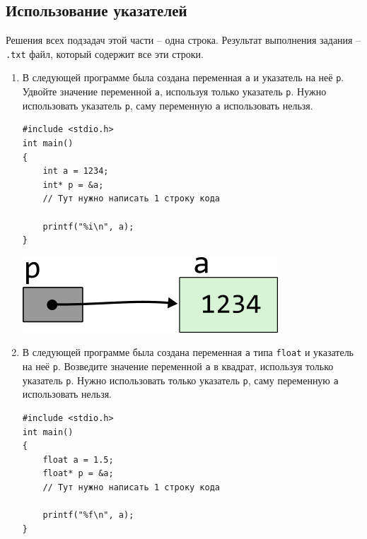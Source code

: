 \documentclass{article}
\begin{document}
\subsection{Использование указателей}
Решения всех подзадач этой части -- одна строка. Результат выполнения задания -- \texttt{.txt} файл, который содержит все эти строки.
\begin{enumerate}
\item В следующей программе была создана переменная \texttt{a} и указатель на неё \texttt{p}. Удвойте значение переменной \texttt{a}, используя только указатель \texttt{p}. Нужно использовать указатель \texttt{p}, саму переменную \texttt{a} использовать нельзя.
\begin{multicols}{2}
\begin{lstlisting}
#include <stdio.h>
int main() 
{
    int a = 1234;
    int* p = &a;
    // Тут нужно написать 1 строку кода
    
    printf("%i\n", a);
}
\end{lstlisting}

\vfill \null    
\columnbreak
\vfill \null 

\begin{center}
\vspace{1cm} 
\includegraphics[scale=1]{../images/pointer_schemes/pointer_to_int.png}
\end{center}
\end{multicols}

\item В следующей программе была создана переменная \texttt{a} типа \texttt{float} и указатель на неё \texttt{p}. Возведите значение переменной \texttt{a} в квадрат, используя только указатель \texttt{p}. Нужно использовать только указатель \texttt{p}, саму переменную \texttt{a} использовать нельзя.
\begin{multicols}{2}
\begin{lstlisting}
#include <stdio.h>
int main() 
{
    float a = 1.5;
    float* p = &a;
    // Тут нужно написать 1 строку кода
    
    printf("%f\n", a);
}
\end{lstlisting}

\vfill \null    
\columnbreak
\vfill \null 


\end{multicols}
\end{enumerate}
\end{document}
